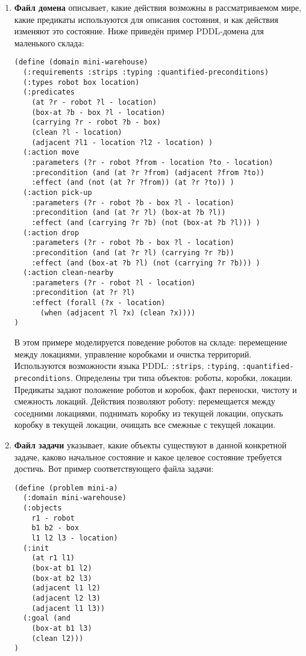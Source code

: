 \documentclass{article}
\begin{document}
\begin{enumerate}
\item \textbf{Файл домена} описывает, какие действия возможны в рассматриваемом мире,
  какие предикаты используются для описания состояния,
    и как действия изменяют это состояние.
    Ниже приведён пример PDDL-домена для маленького склада:

  \begin{verbatim}
(define (domain mini-warehouse)
  (:requirements :strips :typing :quantified-preconditions)
  (:types robot box location)
  (:predicates
    (at ?r - robot ?l - location)
    (box-at ?b - box ?l - location)
    (carrying ?r - robot ?b - box)
    (clean ?l - location)
    (adjacent ?l1 - location ?l2 - location) )
  (:action move
    :parameters (?r - robot ?from - location ?to - location)
    :precondition (and (at ?r ?from) (adjacent ?from ?to))
    :effect (and (not (at ?r ?from)) (at ?r ?to)) )
  (:action pick-up
    :parameters (?r - robot ?b - box ?l - location)
    :precondition (and (at ?r ?l) (box-at ?b ?l))
    :effect (and (carrying ?r ?b) (not (box-at ?b ?l))) )
  (:action drop
    :parameters (?r - robot ?b - box ?l - location)
    :precondition (and (at ?r ?l) (carrying ?r ?b))
    :effect (and (box-at ?b ?l) (not (carrying ?r ?b))) )
  (:action clean-nearby
    :parameters (?r - robot ?l - location)
    :precondition (at ?r ?l)
    :effect (forall (?x - location)
      (when (adjacent ?l ?x) (clean ?x))))
)
  \end{verbatim}

    В этом примере моделируется поведение роботов на складе:
    перемещение между локациями, управление коробками и очистка территорий.
    Используются возможности языка PDDL: \texttt{:strips}, \texttt{:typing}, \texttt{:quantified-preconditions}.
    Определены три типа объектов: роботы, коробки, локации.
    Предикаты задают положение роботов и коробок, факт переноски, чистоту и смежность локаций.
    Действия позволяют роботу: перемещается между соседними локациями,
    поднимать коробку из текущей локации, опускать коробку в текущей локации, очищать все смежные с текущей локации.

\item \textbf{Файл задачи} указывает,
  какие объекты существуют в данной конкретной задаче,
    каково начальное состояние и какое целевое состояние требуется достичь.
    Вот пример соответствующего файла задачи:

  \begin{verbatim}
(define (problem mini-a)
  (:domain mini-warehouse)
  (:objects
    r1 - robot
    b1 b2 - box
    l1 l2 l3 - location)
  (:init
    (at r1 l1)
    (box-at b1 l2)
    (box-at b2 l3)
    (adjacent l1 l2)
    (adjacent l2 l3)
    (adjacent l1 l3))
  (:goal (and
    (box-at b1 l3)
    (clean l2)))
)
  \end{verbatim}


\end{enumerate}
\end{document}
